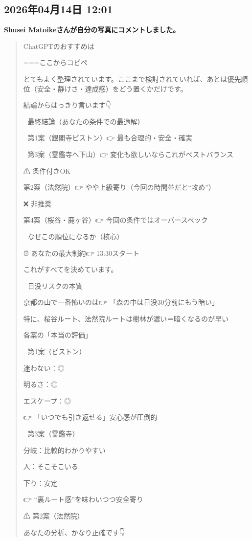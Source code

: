 \subsection*{2026年04月14日 12:01}

\textbf{Shusei Matoikeさんが自分の写真にコメントしました。}

\begin{quote}
ChatGPTのおすすめは

===ここからコピペ

とてもよく整理されています。ここまで検討されていれば、あとは優先順位（安全・静けさ・達成感）をどう置くかだけです。

結論からはっきり言います👇

🎯 最終結論（あなたの条件での最適解）

🥇 第1案（銀閣寺ピストン）👉 最も合理的・安全・確実

🥈 第3案（霊鑑寺へ下山）👉 変化も欲しいならこれがベストバランス

⚠ 条件付きOK

第2案（法然院）👉 やや上級寄り（今回の時間帯だと“攻め”）

❌ 非推奨

第4案（桜谷・鹿ヶ谷）👉 今回の条件ではオーバースペック

🧠 なぜこの順位になるか（核心）

⏰ あなたの最大制約👉 13:30スタート

これがすべてを決めています。

🌇 日没リスクの本質

京都の山で一番怖いのは👉 「森の中は日没30分前にもう暗い」

特に、桜谷ルート、法然院ルートは樹林が濃い＝暗くなるのが早い

各案の「本当の評価」

🥇 第1案（ピストン）

迷わない：◎

明るさ：◎

エスケープ：◎

👉 「いつでも引き返せる」安心感が圧倒的

🥈 第3案（霊鑑寺）

分岐：比較的わかりやすい

人：そこそこいる

下り：安定

👉 “裏ルート感”を味わいつつ安全寄り

⚠ 第2案（法然院）

あなたの分析、かなり正確です👇


\end{quote}
